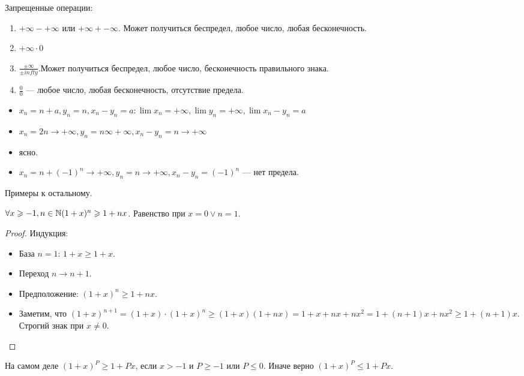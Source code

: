 Запрещенные операции:
\begin{enumerate}
    \item $+\infty - +\infty$ или  $+\infty + -\infty$. Может получиться беспредел, любое число, любая бесконечность.
    \item $+\infty \cdot 0$
    \item $\frac{\pm \infty}{\pm infty}$.Может получиться беспредел, любое число, бесконечность правильного знака.
    \item $\frac{0}{0}$ --- любое число, любая бесконечность, отсутствие предела.
\end{enumerate}
\begin{example}
    \slashn
    \begin{itemize}
        \item $x_n = n + a, y_n=n, x_n-y_n=a: \lim x_n = +\infty, \lim y_n = +\infty, \lim x_n - y_n = a$
        \item  $x_n = 2n \to +\infty, y_n = n \infty + \infty, x_n - y_n = n \to +\infty$
        \item ясно.
        \item  $x_n = n + (-1)^n \to +\infty, y_n = n \to +\infty, x_n - y_n = (-1)^n$ --- нет предела.
    \end{itemize}
\end{example}
\begin{exerc}
    Примеры к остальному.
\end{exerc}
\begin{theorem}
    $\forall x \geqslant -1, n \in \mathbb{N} (1+x)^n \geqslant 1 + nx$. Равенство при $x=0 \lor n=1$.
\end{theorem}
\begin{proof}
    Индукция:
    \begin{itemize}
        \item База $n=1$: $1+x  \ge 1+x$.
        \item Переход $n \to n+1$.
        \item Предположение: $(1+x)^n \ge 1+nx$.
        \item Заметим, что $(1+x)^{n+1} = (1+x)\cdot(1+x)^n \ge (1+x)(1+nx) = 1 + x + nx + nx^2 = 1 + (n+1)x + nx^2 \ge 1 + (n+1)x$. Строгий знак при $x \neq 0$.
    \end{itemize}
\end{proof}
\begin{remark}
    На самом деле $(1+x)^P \ge 1 + Px$, если $x > -1$ и  $P \ge -1$ или $P \le 0$. Иначе верно $(1+x)^P \le 1 + Px$.
\end{remark}
